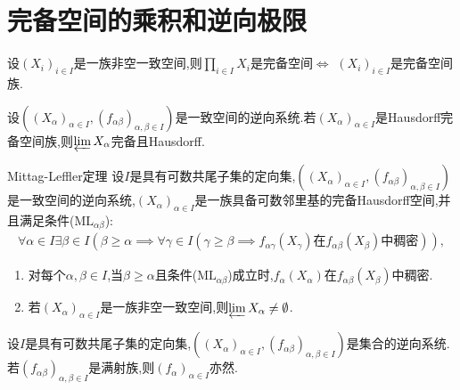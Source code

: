 \section{完备空间的乘积和逆向极限}

\begin{proposition}{}{}
	设$\left(X_{i}\right)_{i\in I}$是一族非空一致空间,则$\prod\limits_{i\in I}X_{i}$是完备空间$\iff$ $\left(X_{i}\right)_{i\in I}$是完备空间族.
\end{proposition}

\begin{corollary}{}{}
	设$\left(\left(X_{\alpha}\right)_{\alpha\in I},\left(f_{\alpha\beta}\right)_{\alpha,\beta\in I}\right)$是一致空间的逆向系统.若$\left(X_{\alpha}\right)_{\alpha\in I}$是Hausdorff完备空间族,则$\varprojlim X_{\alpha}$完备且Hausdorff.
\end{corollary}

\begin{theorem}{Mittag-Leffler定理}{}
	设$I$是具有可数共尾子集的定向集,$\left(\left(X_{\alpha}\right)_{\alpha\in I},\left(f_{\alpha\beta}\right)_{\alpha,\beta\in I}\right)$是一致空间的逆向系统,$\left(X_{\alpha}\right)_{\alpha\in I}$是一族具备可数邻里基的完备Hausdorff空间,并且满足条件($\mathrm{ML}_{\alpha\beta}$):
	\begin{align*}
		\forall\alpha\in I\exists\beta\in I\left(\beta\geq\alpha\implies\forall\gamma\in I\left(\gamma\geq\beta\implies f_{\alpha\gamma}\left(X_{\gamma}\right)\text{在}f_{\alpha\beta}\left(X_{\beta}\right)\text{中稠密}\right)\right),
	\end{align*}
	\begin{enumerate}
		\item 对每个$\alpha,\beta\in I$,当$\beta\geq\alpha$且条件($\mathrm{ML}_{\alpha\beta}$)成立时,$f_{\alpha}\left(X_{\alpha}\right)$在$f_{\alpha\beta}\left(X_{\beta}\right)$中稠密.
		\item 若$\left(X_{\alpha}\right)_{\alpha\in I}$是一族非空一致空间,则$\varprojlim X_{\alpha}\neq\emptyset$.
	\end{enumerate}
\end{theorem}

\begin{corollary}{}{}
	设$I$是具有可数共尾子集的定向集,$\left(\left(X_{\alpha}\right)_{\alpha\in I},\left(f_{\alpha\beta}\right)_{\alpha,\beta\in I}\right)$是集合的逆向系统.若$\left(f_{\alpha\beta}\right)_{\alpha,\beta\in I}$是满射族,则$\left(f_{\alpha}\right)_{\alpha\in I}$亦然.
\end{corollary}

